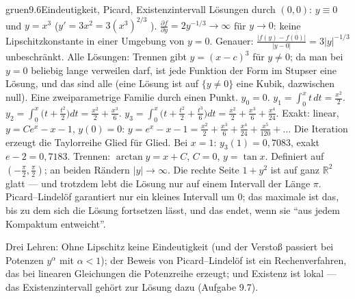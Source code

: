 \begin{loesungkarte}{gruen}{9.6}{Eindeutigkeit, Picard, Existenzintervall}
Lösungen durch $(0, 0)$: $y\equiv0$ und $y = x^{3}$ ($y' = 3x^{2} = 3(x^{3})^{2/3}$ \checkmark). $\frac{\partial f}{\partial y} = 2y^{-1/3}\to\infty$ für $y\to0$: keine Lipschitzkonstante in einer Umgebung von $y = 0$. Genauer: $\frac{|f(y) - f(0)|}{|y - 0|} = 3|y|^{-1/3}$ unbeschränkt. Alle Lösungen: Trennen gibt $y = (x - c)^{3}$ für $y\neq0$; da man bei $y = 0$ beliebig lange verweilen darf, ist jede Funktion der Form im Stupser eine Lösung, und das sind alle (eine Lösung ist auf $\{y\neq0\}$ eine Kubik, dazwischen null). Eine zweiparametrige Familie durch einen Punkt.
$y_0 = 0$. $y_1 = \int_0^{x}t\,dt = \frac{x^{2}}2$. $y_2 = \int_0^{x}\bigl(t + \frac{t^{2}}2\bigr)dt = \frac{x^{2}}2 + \frac{x^{3}}6$. $y_3 = \int_0^{x}\bigl(t + \frac{t^{2}}2 + \frac{t^{3}}6\bigr)dt = \frac{x^{2}}2 + \frac{x^{3}}6 + \frac{x^{4}}{24}$. Exakt: linear, $y = Ce^{x} - x - 1$, $y(0) = 0$: $y = e^{x} - x - 1 = \frac{x^{2}}2 + \frac{x^{3}}6 + \frac{x^{4}}{24} + \frac{x^{5}}{120} + \dots$ Die Iteration erzeugt die Taylorreihe Glied für Glied. Bei $x = 1$: $y_3(1) = 0{,}7083$, exakt $e - 2 = 0{,}7183$.
Trennen: $\arctan y = x + C$, $C = 0$, $y = \tan x$. Definiert auf $(-\frac\pi2, \frac\pi2)$; an beiden Rändern $|y|\to\infty$. Die rechte Seite $1 + y^{2}$ ist auf ganz $\mathbb R^{2}$ glatt --- und trotzdem lebt die Lösung nur auf einem Intervall der Länge $\pi$. Picard--Lindelöf garantiert nur ein kleines Intervall um $0$; das maximale ist das, bis zu dem sich die Lösung fortsetzen lässt, und das endet, wenn sie \enquote{aus jedem Kompaktum entweicht}.
\begin{mitnehmen}\kastentext
Drei Lehren: Ohne Lipschitz keine Eindeutigkeit (und der Verstoß passiert bei Potenzen $y^{\alpha}$ mit $\alpha < 1$); der Beweis von Picard--Lindelöf ist ein Rechenverfahren, das bei linearen Gleichungen die Potenzreihe erzeugt; und Existenz ist lokal --- das Existenzintervall gehört zur Lösung dazu (Aufgabe 9.7).
\end{mitnehmen}
\end{loesungkarte}

